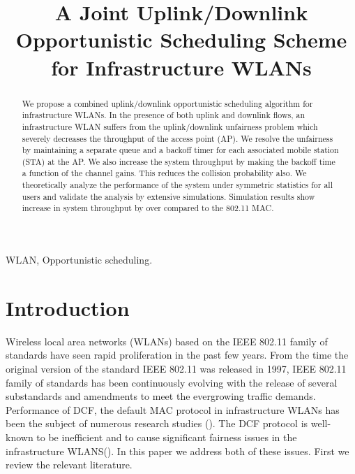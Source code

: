\documentclass[10pt,conference]{IEEEtran}
\begin{document}
\title{A Joint Uplink/Downlink Opportunistic Scheduling Scheme for Infrastructure WLANs}
\author{ 

}
\maketitle
\begin{abstract}
We propose a combined uplink/downlink opportunistic scheduling algorithm for infrastructure WLANs.
In the presence of both uplink and downlink flows, an infrastructure WLAN suffers from the uplink/downlink unfairness problem which severely decreases the throughput of the access point (AP).
We resolve the unfairness by maintaining a separate queue and a backoff timer for each associated mobile station (STA) at the AP.
We also increase the system throughput by making the backoff time a function of the channel gains. This reduces the collision probability also.
We theoretically analyze the performance of the system under symmetric statistics for all users and validate the analysis by extensive simulations.
Simulation results show increase in system throughput by over  compared to the 802.11 MAC.

\end{abstract}

\begin{keywords}
 WLAN, Opportunistic scheduling.
\end{keywords}

\section{Introduction}
\label{sec:Intro}
Wireless local area networks (WLANs) based on the IEEE 802.11 family of standards have seen rapid proliferation in the past few years. From the time the original version of the standard IEEE 802.11 was released in 1997, 
IEEE 802.11 family of standards has been continuously evolving with the release of several substandards and amendments to meet the evergrowing traffic demands.
Performance of DCF, the default MAC protocol in infrastructure WLANs has been the subject of numerous research studies (\cite{bianchi00,kumar05,kuriakose07}). 
The DCF protocol is well-known to be inefficient and to cause significant fairness issues in the infrastructure WLANS(\cite{Heusse03,kim2005downlink,nischal13}).
 In this paper we address both of these issues.
First we review the relevant literature.
\end{document}
